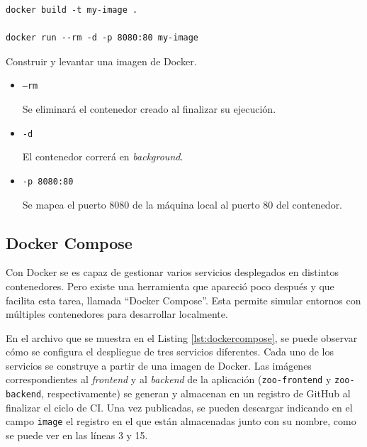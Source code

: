 \begin{listing}[!ht]
  \begin{verbatim}
docker build -t my-image .

docker run --rm -d -p 8080:80 my-image
\end{verbatim}
\caption{Construir y levantar una imagen de Docker.}
\label{lst:dockerbuildrun}
\end{listing}

\begin{itemize}
  \item \texttt{--rm}

    Se eliminará el contenedor creado al finalizar su ejecución.

  \item \texttt{-d}

    El contenedor correrá en \textit{background}.

  \item \texttt{-p 8080:80}

    Se mapea el puerto 8080 de la máquina local al puerto 80 del contenedor.
\end{itemize}

\subsection*{Docker Compose}
\label{tech:docker-compose}

Con Docker se es capaz de gestionar varios servicios desplegados en distintos contenedores. Pero existe una herramienta que apareció poco después y que facilita esta tarea, llamada ``Docker Compose''\cite{docker-compose}. Esta permite simular entornos con múltiples contenedores para desarrollar localmente.

En el archivo que se muestra en el Listing \ref{lst:dockercompose}, se puede observar cómo se configura el despliegue de tres servicios diferentes. Cada uno de los servicios se construye a partir de una imagen de Docker. Las imágenes correspondientes al \textit{frontend} y al \textit{backend} de la aplicación (\texttt{zoo-frontend} y \texttt{zoo-backend}, respectivamente) se generan y almacenan en un registro de GitHub al finalizar el ciclo de CI. Una vez publicadas, se pueden descargar indicando en el campo \texttt{image} el registro en el que están almacenadas junto con su nombre, como se puede ver en las líneas 3 y 15.

